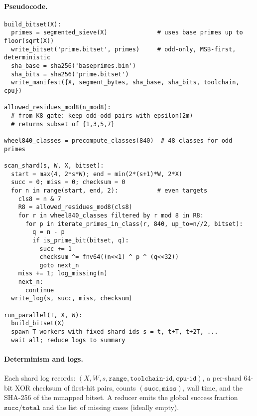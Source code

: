 \documentclass[11pt]{article}
\theoremstyle{definition}
\theoremstyle{remark}
\begin{document}
\paragraph{Pseudocode.}
\begin{verbatim}
build_bitset(X):
  primes = segmented_sieve(X)              # uses base primes up to floor(sqrt(X))
  write_bitset('prime.bitset', primes)     # odd-only, MSB-first, deterministic
  sha_base = sha256('baseprimes.bin')
  sha_bits = sha256('prime.bitset')
  write_manifest({X, segment_bytes, sha_base, sha_bits, toolchain, cpu})

allowed_residues_mod8(n_mod8):
  # from K8 gate: keep odd-odd pairs with epsilon(2m)
  # returns subset of {1,3,5,7}

wheel840_classes = precompute_classes(840)  # 48 classes for odd primes

scan_shard(s, W, X, bitset):
  start = max(4, 2*s*W); end = min(2*(s+1)*W, 2*X)
  succ = 0; miss = 0; checksum = 0
  for n in range(start, end, 2):           # even targets
    cls8 = n & 7
    R8 = allowed_residues_mod8(cls8)
    for r in wheel840_classes filtered by r mod 8 in R8:
      for p in iterate_primes_in_class(r, 840, up_to=n//2, bitset):
        q = n - p
        if is_prime_bit(bitset, q):
          succ += 1
          checksum ^= fnv64((n<<1) ^ p ^ (q<<32))
          goto next_n
    miss += 1; log_missing(n)
    next_n:
      continue
  write_log(s, succ, miss, checksum)

run_parallel(T, X, W):
  build_bitset(X)
  spawn T workers with fixed shard ids s = t, t+T, t+2T, ...
  wait all; reduce logs to summary
\end{verbatim}

\paragraph{Determinism and logs.} Each shard log records: $(X,W,s,\texttt{range},\texttt{toolchain-id},\texttt{cpu-id})$, a per-shard 64-bit XOR checksum of first-hit pairs, counts $(\texttt{succ},\texttt{miss})$, wall time, and the SHA-256 of the mmapped bitset. A reducer emits the global success fraction $\texttt{succ}/\texttt{total}$ and the list of missing cases (ideally empty).
\end{document}
